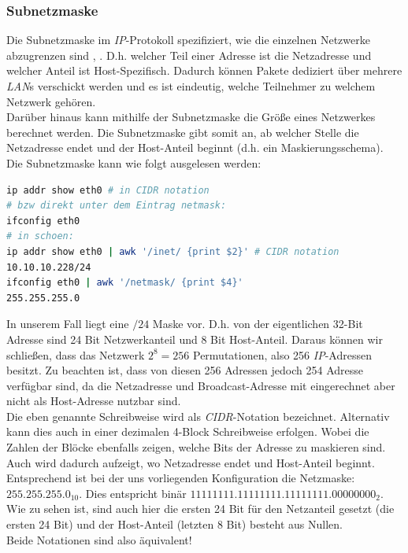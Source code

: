 \documentclass[paper=a4,fontsize=11pt]{scrartcl}%
\numberwithin{equation}{section}
\begin{document}
\subsubsection{Subnetzmaske} \label{subnetmask}
Die Subnetzmaske im \emph{IP}-Protokoll spezifiziert, wie die einzelnen Netzwerke abzugrenzen sind \cite[S. 340f]{Kurose:2012:CNT:2584507}, \cite{rfc950}. D.h. welcher Teil einer Adresse ist die Netzadresse und welcher Anteil ist Host-Spezifisch. Dadurch können Pakete dediziert über mehrere \emph{LAN}s verschickt werden und es ist eindeutig, welche Teilnehmer zu welchem Netzwerk gehören.\\
Darüber hinaus kann mithilfe der Subnetzmaske die Größe eines Netzwerkes berechnet werden. Die Subnetzmaske gibt somit an, ab welcher Stelle die Netzadresse endet und der Host-Anteil beginnt (d.h. ein Maskierungsschema).\\

Die Subnetzmaske kann wie folgt ausgelesen werden:
\begin{lstlisting}[style=Bash, language=Bash]
ip addr show eth0 # in CIDR notation
# bzw direkt unter dem Eintrag netmask:
ifconfig eth0
# in schoen:
ip addr show eth0 | awk '/inet/ {print $2}' # CIDR notation
10.10.10.228/24
ifconfig eth0 | awk '/netmask/ {print $4}'
255.255.255.0
\end{lstlisting}

In unserem Fall liegt eine $/24$ Maske vor. D.h. von der eigentlichen 32-Bit Adresse sind 24 Bit Netzwerkanteil und 8 Bit Host-Anteil. Daraus können wir schließen, dass das Netzwerk $2^8=256$ Permutationen, also 256 \emph{IP}-Adressen besitzt. Zu beachten ist, dass von diesen 256 Adressen jedoch 254 Adresse verfügbar sind, da die Netzadresse und Broadcast-Adresse mit eingerechnet aber nicht als Host-Adresse nutzbar sind.\\
Die eben genannte Schreibweise wird als \emph{\ac{CIDR}}-Notation bezeichnet. Alternativ kann dies auch in einer dezimalen 4-Block Schreibweise erfolgen. Wobei die Zahlen der Blöcke ebenfalls zeigen, welche Bits der Adresse zu maskieren sind. Auch wird dadurch aufzeigt, wo Netzadresse endet und Host-Anteil beginnt.\\
Entsprechend ist bei der uns vorliegenden Konfiguration die Netzmaske: $255.255.255.0_{10}$. Dies entspricht binär $11111111.11111111.11111111.00000000_2$. Wie zu sehen ist, sind auch hier die ersten 24 Bit für den Netzanteil gesetzt (die ersten 24 Bit) und der Host-Anteil (letzten 8 Bit) besteht aus Nullen.\\
Beide Notationen sind also äquivalent!
\end{document}
